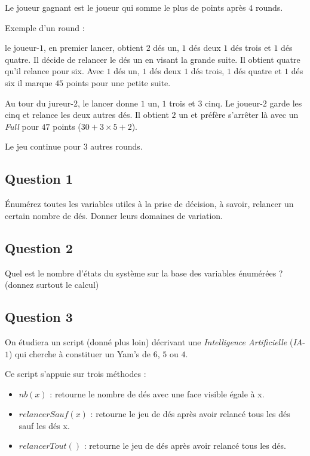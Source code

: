 \documentclass[a4paper, 10pt]{article}
\begin{document}
\smallskip

Le joueur gagnant est le joueur qui somme le plus de points après $4$ rounds.

\smallskip

Exemple d'un round :

\smallskip

le joueur-$1$, en premier lancer, obtient $2$ dés un, $1$ dés deux $1$ dés trois et $1$ dés quatre. Il décide de relancer le dés un en visant la grande suite. Il obtient quatre qu'il relance pour six. Avec $1$ dés un, $1$ dés deux $1$ dés trois, $1$ dés quatre et $1$ dés six il marque $45$ points pour une petite suite.

\smallskip

Au tour du jureur-$2$, le lancer donne $1$ un, $1$ trois et $3$ cinq. Le joueur-$2$ garde les cinq et relance les deux autres dés. Il obtient $2$ un et préfère s'arrêter là avec un \emph{Full} pour $47$ points ($30 + 3\times 5 + 2$).

\smallskip

Le jeu continue pour $3$ autres rounds.


\subsection*{Question 1}%

  Énumérez toutes les variables utiles à la prise de décision, à savoir, relancer un certain nombre de dés. Donner leurs domaines de variation.  


\subsection*{Question 2}%
  
  Quel est le nombre d'états du système sur la base des variables énumérées ? (donnez surtout le calcul)

  
\subsection*{Question 3}%
  
  On étudiera un script (donné plus loin) décrivant une \emph{Intelligence Artificielle} (\emph{IA}-$1$) qui cherche à constituer un Yam's de $6$, $5$ ou $4$.

  Ce script s'appuie sur trois m\'ethodes : 
  \begin{itemize}
   \item $\mathit{nb}(x)$ : retourne le nombre de dés avec une face visible égale à x.
   \item $\mathit{relancerSauf}(x)$ : retourne le jeu de dés après avoir relancé tous les dés sauf les dés x. 
   \item $\mathit{relancerTout}()$ : retourne le jeu de dés après avoir relancé tous les dés.
  \end{itemize}
  
\end{document}
